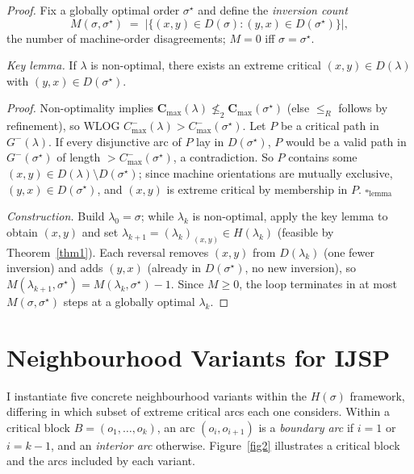\documentclass[preprint,12pt]{elsarticle}
\begin{document}
\begin{proof}
Fix a globally optimal order $\sigma^{\star}$ and define the \emph{inversion count}
\[
  M(\sigma,\sigma^{\star}) \;=\; \bigl|\{(x,y)\in D(\sigma) : (y,x)\in D(\sigma^{\star})\}\bigr|,
\]
the number of machine-order disagreements; $M=0$ iff $\sigma=\sigma^{\star}$.

\medskip
\noindent\textit{Key lemma.} If $\lambda$ is non-optimal, there exists an extreme critical $(x,y)\in D(\lambda)$ with $(y,x)\in D(\sigma^{\star})$.

\noindent\textit{Proof.} Non-optimality implies $\mathbf{C}_{\max}(\lambda)\not\le_2 \mathbf{C}_{\max}(\sigma^{\star})$ (else $\le_R$ follows by refinement), so WLOG $C^-_{\max}(\lambda)>C^-_{\max}(\sigma^{\star})$. Let $P$ be a critical path in $G^-(\lambda)$. If every disjunctive arc of $P$ lay in $D(\sigma^{\star})$, $P$ would be a valid path in $G^-(\sigma^{\star})$ of length $>C^-_{\max}(\sigma^{\star})$, a contradiction. So $P$ contains some $(x,y)\in D(\lambda)\setminus D(\sigma^{\star})$; since machine orientations are mutually exclusive, $(y,x)\in D(\sigma^{\star})$, and $(x,y)$ is extreme critical by membership in $P$. \hfill$\square_{\text{lemma}}$

\medskip
\noindent\textit{Construction.} Build $\lambda_0=\sigma$; while $\lambda_k$ is non-optimal, apply the key lemma to obtain $(x,y)$ and set $\lambda_{k+1}=(\lambda_k)_{(x,y)}\in H(\lambda_k)$ (feasible by Theorem~\ref{thm1}). Each reversal removes $(x,y)$ from $D(\lambda_k)$ (one fewer inversion) and adds $(y,x)$ (already in $D(\sigma^{\star})$, no new inversion), so $M(\lambda_{k+1},\sigma^{\star})=M(\lambda_k,\sigma^{\star})-1$. Since $M\ge 0$, the loop terminates in at most $M(\sigma,\sigma^{\star})$ steps at a globally optimal $\lambda_k$.
\end{proof}


\section{Neighbourhood Variants for IJSP}
\label{sec:variants}

I instantiate five concrete neighbourhood variants within the $H(\sigma)$ framework, differing in which subset of extreme critical arcs each one considers. Within a critical block $B = (o_1,\ldots,o_k)$, an arc $(o_i,o_{i+1})$ is a \emph{boundary arc} if $i=1$ or $i=k-1$, and an \emph{interior arc} otherwise. Figure~\ref{fig2} illustrates a critical block and the arcs included by each variant.
\end{document}
